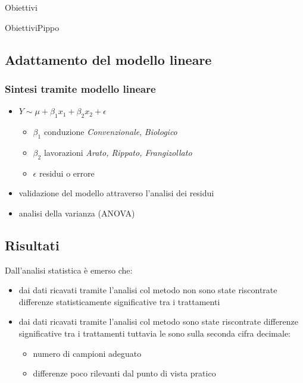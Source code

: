 \documentclass[10pt]{beamer}
\begin{document}
\begin{frame}{Obiettivi}
\begin{frame}{Obiettivi}{Pippo}
\subsection{Adattamento del modello lineare}
\begin{frame}
  \frametitle{Sintesi tramite modello lineare}
  \begin{itemize}
    \item 
    \vspace{0.25cm}
    $Y \sim \mu + \beta_1x_1 + \beta_2x_2 + \epsilon$
    \vspace{0.25cm}

    \begin{itemize}

      \item $\beta_1$ conduzione \newline
      \emph{Convenzionale}, \emph{Biologico}

      \item $\beta_2$ lavorazioni \newline \emph{Arato, Rippato,
        Frangizollato}

      \item$\epsilon$ residui o errore
    \end{itemize}
    \item validazione del modello attraverso l'analisi
    dei residui 
    \item analisi della varianza (ANOVA)
  \end{itemize}
\end{frame}

\subsection{Risultati}
\begin{frame}[label=densita]
  Dall'analisi statistica \`e emerso che:
  \begin{itemize}[<+->]
  \item dai dati ricavati tramite
    l'analisi col metodo \hyperlink{Core}{} non sono
    state riscontrate differenze statisticamente significative tra i
    trattamenti
  \item dai dati ricavati tramite l'analisi col metodo
    \hyperlink{Clod}{} sono state riscontrate
    differenze significative tra i trattamenti tuttavia le \hyperlink{summary}{}
    sono sulla seconda cifra decimale:
    \begin{itemize}[<+->]
    \item numero di campioni adeguato
    \item differenze poco rilevanti dal punto di vista pratico
    \end{itemize}
  \end{itemize}
\end{frame}



\end{frame}
\end{frame}
\end{document}
